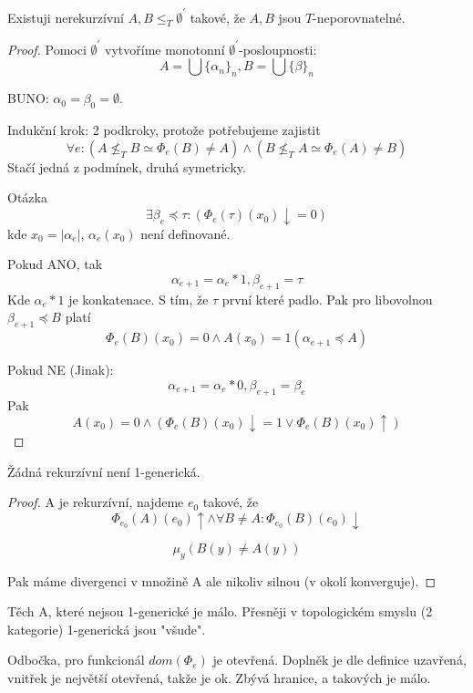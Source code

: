 \begin{theorem}
	Existuji nerekurzívní $A, B \leq_T \emptyset^{\prime}$ takové, že $A, B$ jsou $T$-neporovnatelné.
\end{theorem}
\begin{proof}
	Pomoci $\emptyset^{\prime}$ vytvoříme monotonní $\emptyset^{\prime}$-posloupnosti:
	\[ A = \bigcup \{\alpha_n\}_n, B = \bigcup \{\beta\}_n \]

	BUNO: $\alpha_0 = \beta_0 = \emptyset$.

	Indukční krok: 2 podkroky, protože potřebujeme zajistit
	\[ \forall e: (A \nleq_T B \simeq \Phi_e(B) \neq A) \land (B \nleq_T A \simeq \Phi_e(A) \neq B) \]
	Stačí jedná z podmínek, druhá symetricky.

	Otázka
	\[ \exists \beta_e \preccurlyeq \tau: (\Phi_e(\tau)(x_0)\downarrow = 0) \]
	kde $x_0 = |\alpha_e|$, $\alpha_e(x_0)$ není definované.

	Pokud ANO, tak
	\[ \alpha_{e + 1} = \alpha_{e} \ast 1, \beta_{e + 1} = \tau \]
	Kde $\alpha_{e} \ast 1$ je konkatenace.
	S tím, že $\tau$ první které padlo.
	Pak pro libovolnou $\beta_{e + 1} \preccurlyeq B$ platí
	\[ \Phi_e(B)(x_0) = 0 \land A(x_0) = 1 (\alpha_{e + 1} \preccurlyeq A)\]

	Pokud NE (Jinak):
	\[ \alpha_{e + 1} = \alpha_{e} \ast 0, \beta_{e + 1} = \beta_e \]
	Pak
	\[ A(x_0) = 0 \land (\Phi_e(B)(x_0) \downarrow = 1 \lor \Phi_e(B)(x_0) \uparrow) \]
\end{proof}

\begin{theorem}[R.S. a 1-generické]
	Žádná rekurzívní není 1-generická.
\end{theorem}
\begin{proof}
	A je rekurzívní, najdeme $e_0$ takové, že
	\[ \Phi_{e_0}(A)(e_0) \uparrow \land \forall B \neq A: \Phi_{e_0}(B)(e_0) \downarrow \]

	\[ \mu_y (B(y) \neq A(y)) \]

	Pak máme divergenci v množině A ale nikoliv silnou (v okolí konverguje).
\end{proof}

\begin{note}
	Těch A, které nejsou 1-generické je málo.
	Přesněji v topologickém smyslu (2 kategorie) 1-generická jsou "všude".

	Odbočka, pro funkcionál $dom(\Phi_e)$ je otevřená.
	Doplněk je dle definice uzavřená, vnitřek je největší otevřená, takže je ok.
	Zbývá hranice, a takových je málo.
\end{note}

